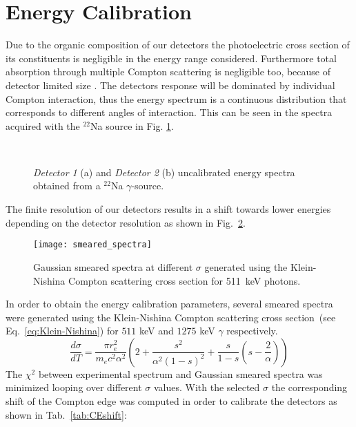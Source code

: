 
\section*{Energy Calibration}

Due to the organic composition of our detectors the photoelectric cross section of its constituents is negligible in the energy range considered. Furthermore total absorption through multiple Compton scattering is negligible too, because of detector limited size . The detectors response will be dominated by individual Compton interaction, thus the energy spectrum is a continuous distribution that corresponds to different angles of interaction. This can be seen in the spectra acquired with the $^{22}$Na source in Fig. \ref{fig: uncalibrated energy spectra}.

\begin{figure}[h!]
\centering
{} \quad
{} \\
\caption{\emph{Detector 1} (a) and \emph{Detector 2} (b) uncalibrated energy spectra  obtained from a $^{22}$Na $\gamma$-source.}
\label{fig: uncalibrated energy spectra}
\end{figure}

The finite resolution of our detectors results in a shift towards lower energies depending on the detector resolution as shown in Fig.~\ref{fig: smeared spectra}.
\begin{figure}[h!]
\centering
\texttt{[image: smeared\_spectra]}
\caption{Gaussian smeared spectra at different $\sigma$ generated using the  Klein-Nishina Compton scattering cross section  for 511~keV photons.}
\label{fig: smeared spectra}
\end{figure}

In order to obtain the energy calibration parameters, several smeared spectra were generated using the  Klein-Nishina Compton scattering cross section~(see Eq.~\ref{eq:Klein-Nishina}) for $511$ keV and $1275$ keV $\gamma$ respectively.
\begin{equation}
\dfrac{d\sigma}{dT} = \dfrac{\pi r_e^2}{m_ec^2\alpha^2}\left(2+\dfrac{s^2}{\alpha^2(1-s)^2}+\dfrac{s}{1-s} \left(s-\dfrac{2}{\alpha}\right) \right)
\label{eq:Klein-Nishina}
\end{equation}
The $\chi^2$ between experimental spectrum and Gaussian smeared spectra was minimized looping over different $\sigma$ values. With the selected $\sigma$ the corresponding shift of the Compton edge was computed in order to calibrate the detectors as shown in Tab.~\ref{tab:CEshift}:


